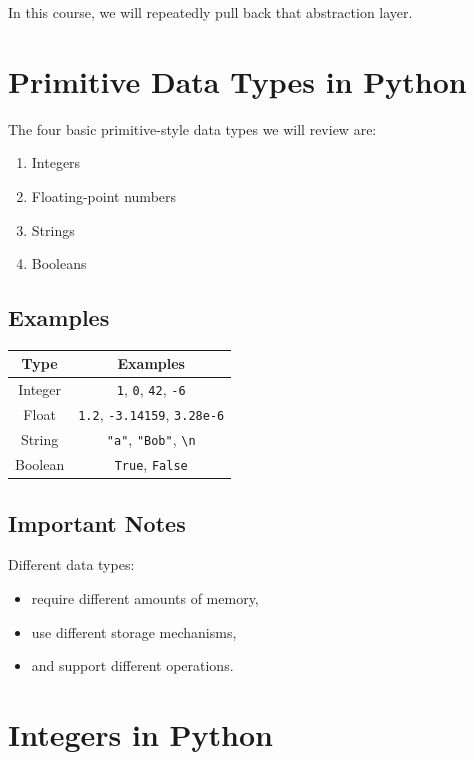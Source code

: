 \documentclass[11pt]{article}
\begin{document}
In this course, we will repeatedly pull back that abstraction layer.

\section{Primitive Data Types in Python}

The four basic primitive-style data types we will review are:

\begin{enumerate}
    \item Integers
    \item Floating-point numbers
    \item Strings
    \item Booleans
\end{enumerate}

\subsection{Examples}

\begin{center}
\begin{tabular}{|c|c|}
\hline
Type & Examples \\
\hline
Integer & \texttt{1}, \texttt{0}, \texttt{42}, \texttt{-6} \\
Float & \texttt{1.2}, \texttt{-3.14159}, \texttt{3.28e-6} \\
String & \verb|"a"|, \verb|"Bob"|, \verb|\n| \\
Boolean & \texttt{True}, \texttt{False} \\
\hline
\end{tabular}
\end{center}

\subsection{Important Notes}

Different data types:

\begin{itemize}
    \item require different amounts of memory,
    \item use different storage mechanisms,
    \item and support different operations.
\end{itemize}

\section{Integers in Python}
\end{document}
